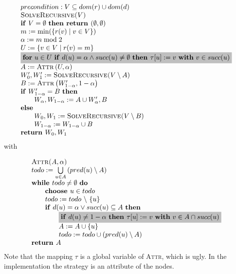 \documentclass{article}
\newcommand{\Return}{\text{\textbf{return }}}
\begin{document}
\begin{equation*}
\begin{array}{l}
precondition: V \subseteq dom(r) \cup dom(d) \\
\text{\textsc{SolveRecursive(}}V\text{\textsc{)}} \\ 
\text{\textbf{if} }V=\emptyset \text{ \textbf{then return }}(\emptyset
,\emptyset ) \\ 
m:=\min (\{r(v)\mid v\in V\}) \\ 
\alpha := m \bmod 2 \\ 
U:=\{v\in V\mid r(v)=m\} \\ 
\colorbox{lightgray}{$
\text{\textbf{for} }u\in U\text{ \textbf{if} }d(u)=\alpha \wedge succ(u)\neq
\emptyset \text{ \textbf{then }}\tau \lbrack u]:=v\text{ \textbf{with} }v\in
succ(u) $}\\ 
A:=\text{\textsc{Attr}}\left( U,\alpha \right)  \\ 
W_{0}^{\prime },W_{1}^{\prime }:=\text{\textsc{SolveRecursive(}}V\setminus A%
\text{)} \\ 
B:=\text{\textsc{Attr}}\left( W_{1-\alpha }^{\prime },1-\alpha \right)  \\ 
\text{\textbf{if} }W_{1-\alpha }^{\prime }=B\text{ \textbf{then}} \\ 
\qquad W_{\alpha },W_{1-\alpha }:=A\cup W_{\alpha }^{\prime },B \\ 
\text{\textbf{else}} \\ 
\qquad W_{0},W_{1}:=\text{\textsc{SolveRecursive(}}V\setminus B\text{)} \\ 
\qquad W_{1-\alpha }:=W_{1-\alpha }\cup B \\ 
\Return W_{0},W_{1}
\end{array}
\end{equation*}
with

\begin{equation*}
\begin{array}{l}
\text{\textsc{Attr(}}A,\alpha \text{\textsc{)}} \\ 
todo:=\bigcup\limits_{u\in A}\left( pred(u)\setminus A\right)  \\ 
\text{\textbf{while }}todo\neq \emptyset \text{ \textbf{do}} \\ 
\qquad \text{\textbf{choose }}u\in todo \\ 
\qquad todo:=todo\ \backslash \ \{u\} \\ 
\qquad \text{\textbf{if} }d(u) = \alpha \vee succ(u)\subseteq A\text{ \textbf{then}} \\ 
\qquad \qquad \colorbox{lightgray}{$%
\text{\textbf{if} }d(u)\neq 1 - \alpha \text{ \textbf{then }}\tau
\lbrack u]:=v\text{ \textbf{with} }v\in A\cap succ(u) $}\\ 
\qquad \qquad A:=A\cup \{u\} \\ 
\qquad \qquad todo:=todo\cup \left( pred(u)\setminus A\right)  \\ 
\Return A%
\end{array}%
\end{equation*}%
Note that the mapping $\tau$ is a global variable of \textsc{Attr}, which is ugly.
In the implementation the strategy is an attribute of the nodes.
\end{document}
